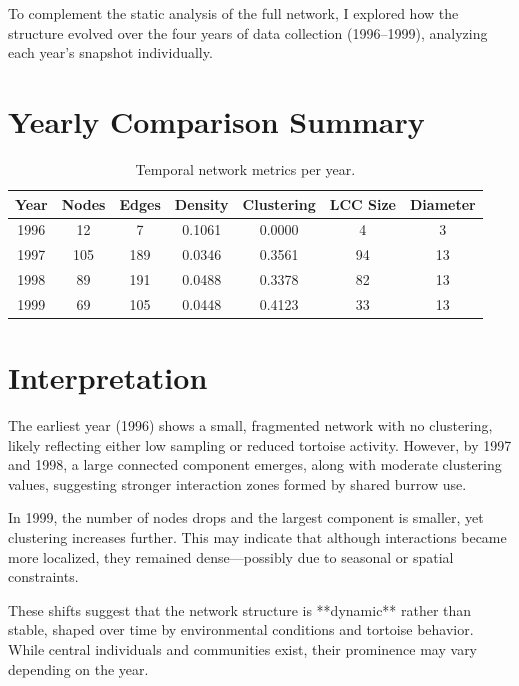 \documentclass[12pt]{report}
\begin{document}
To complement the static analysis of the full network, I explored how the structure evolved over the four years of data collection (1996–1999), analyzing each year's snapshot individually.

\section*{Yearly Comparison Summary}

\begin{table}[h!]
    \centering
    \begin{tabular}{|c|c|c|c|c|c|c|}
        \hline
        \textbf{Year} & \textbf{Nodes} & \textbf{Edges} & \textbf{Density} & \textbf{Clustering} & \textbf{LCC Size} & \textbf{Diameter} \\\hline
        1996 & 12 & 7 & 0.1061 & 0.0000 & 4 & 3 \\\hline
        1997 & 105 & 189 & 0.0346 & 0.3561 & 94 & 13 \\\hline
        1998 & 89 & 191 & 0.0488 & 0.3378 & 82 & 13 \\\hline
        1999 & 69 & 105 & 0.0448 & 0.4123 & 33 & 13 \\\hline
    \end{tabular}
    \caption{Temporal network metrics per year.}
    \label{tab:temporal-comparison}
\end{table}

\section*{Interpretation}

The earliest year (1996) shows a small, fragmented network with no clustering, likely reflecting either low sampling or reduced tortoise activity. However, by 1997 and 1998, a large connected component emerges, along with moderate clustering values, suggesting stronger interaction zones formed by shared burrow use.

In 1999, the number of nodes drops and the largest component is smaller, yet clustering increases further. This may indicate that although interactions became more localized, they remained dense—possibly due to seasonal or spatial constraints.

These shifts suggest that the network structure is **dynamic** rather than stable, shaped over time by environmental conditions and tortoise behavior. While central individuals and communities exist, their prominence may vary depending on the year.
\end{document}
